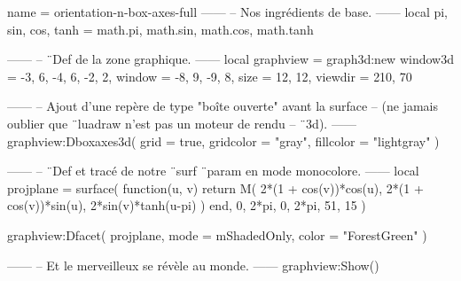 \documentclass{standalone}
\begin{document}
\begin{luadraw}{name = orientation-n-box-axes-full}
------
-- Nos ingrédients de base.
------
local pi, sin, cos, tanh = math.pi, math.sin, math.cos, math.tanh

------
-- ¨Def de la zone graphique.
------
local graphview = graph3d:new{
  window3d = {-3, 6, -4, 6, -2, 2},
  window   = {-8, 9, -9, 8},
  size     = {12, 12},
  viewdir  = {210, 70}
}

------
-- Ajout d'une repère de type "boîte ouverte" avant la surface
-- (ne jamais oublier que ¨luadraw n'est pas un moteur de rendu
-- ¨3d).
------
graphview:Dboxaxes3d({
  grid      = true,
  gridcolor = "gray",
  fillcolor = "lightgray"
})

------
-- ¨Def et tracé de notre ¨surf ¨param en mode monocolore.
------
local projplane = surface(
  function(u, v)
    return M(
      2*(1 + cos(v))*cos(u),
      2*(1 + cos(v))*sin(u),
      2*sin(v)*tanh(u-pi)
    )
  end,
  0, 2*pi, 0, 2*pi,
  {51, 15}
)

graphview:Dfacet(
  projplane,
  {
    mode  = mShadedOnly,
    color = "ForestGreen"
  }
)

------
-- Et le merveilleux se révèle au monde.
------
graphview:Show()
\end{luadraw}
\end{document}
